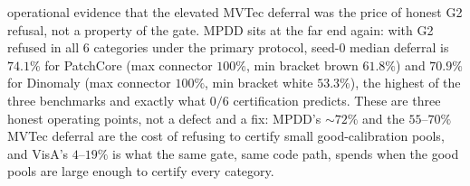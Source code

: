 \documentclass[11pt]{article}
\begin{document}
operational evidence that the elevated MVTec deferral was the price of honest G2 refusal, not a
property of the gate. MPDD sits at the far end again: with G2 refused in all $6$ categories under
the primary protocol, seed-$0$ median deferral is $74.1\%$ for PatchCore (max connector $100\%$,
min bracket brown $61.8\%$) and $70.9\%$ for Dinomaly (max connector $100\%$, min bracket white
$53.3\%$), the highest of the three benchmarks and exactly what $0/6$ certification predicts.
These are three honest operating points, not a defect and a fix: MPDD's $\sim 72\%$ and the
$55$--$70\%$ MVTec deferral are the cost of refusing to certify small good-calibration pools,
and VisA's $4$--$19\%$ is what the same gate, same code path, spends when the good pools are large
enough to certify every category.
\end{document}
